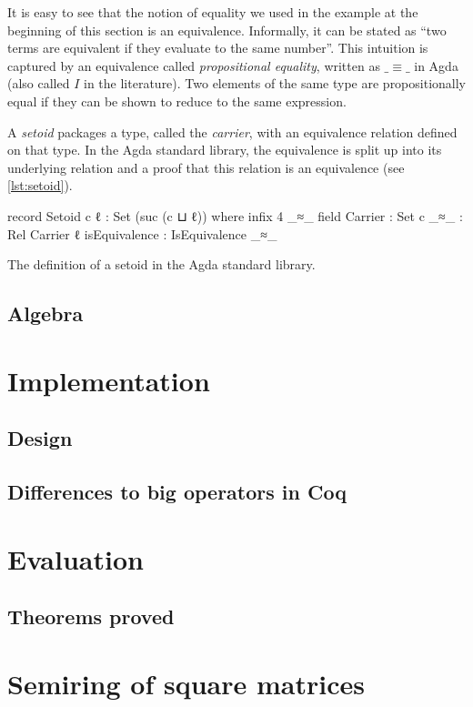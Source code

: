 It is easy to see that the notion of equality we used in the example at the beginning of this section is an equivalence. Informally, it can be stated as \enquote{two terms are equivalent if they evaluate to the same number}. This intuition is captured by an equivalence called \emph{propositional equality}, written as \(\_\!\!\equiv\!\!\_\) in Agda (also called \(I\) in the literature). Two elements of the same type are propositionally equal if they can be shown to reduce to the same expression.


A \emph{setoid} packages a type, called the \emph{carrier}, with an equivalence relation defined on that type. In the Agda standard library, the equivalence is split up into its underlying relation and a proof that this relation is an equivalence (see \cref{lst:setoid}).

\begin{listing}[h]
    \begin{agdacode}
record Setoid c ℓ : Set (suc (c ⊔ ℓ)) where
  infix 4 _≈_
  field
    Carrier       : Set c
    _≈_           : Rel Carrier ℓ
    isEquivalence : IsEquivalence _≈_
    \end{agdacode}
    \label{lst:setoid}
    \caption{The definition of a setoid in the Agda standard library.}
\end{listing}


\section{Algebra}

\chapter{Implementation}

\section{Design}

\section{Differences to big operators in Coq}

\chapter{Evaluation}

\section{Theorems proved}

\appendix

\chapter{Semiring of square matrices}


